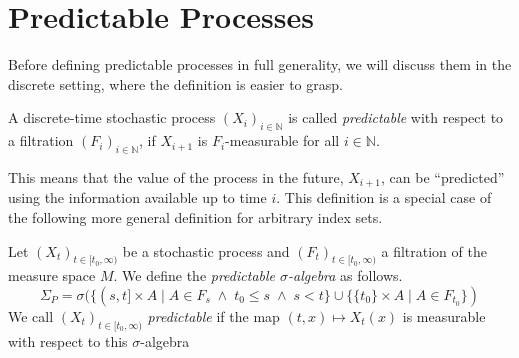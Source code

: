 \section{Predictable Processes}

Before defining predictable processes in full generality, we will discuss them in the discrete setting, where the definition is easier to grasp.

\begin{definition}
	A discrete-time stochastic process $(X_i)_{i\in\mathbb{N}}$ is called \textit{predictable} with respect to a filtration $(F_i)_{i\in\mathbb{N}}$, if $X_{i + 1}$ is $F_i$-measurable for all $i \in \mathbb{N}$.
\end{definition}

This means that the value of the process in the future, $X_{i+1}$, can be ``predicted'' using the information available up to time $i$. This definition is a special case of the following more general definition for arbitrary index sets.

\begin{definition}
	Let $(X_t)_{t\in[t_0, \infty)}$ be a stochastic process and $(F_t)_{t\in[t_0, \infty)}$ a filtration of the measure space $M$. We define the \textit{predictable $\sigma$-algebra} as follows.
	\[
		\Sigma_P = \sigma(\{(s,t] \times A \;\vert\; A \in F_s \;\wedge\; t_0 \le s \;\wedge\; s < t \} \cup \{\{t_0\} \times A \;\vert\; A \in F_{t_0}\})
	\]
	We call $(X_t)_{t\in[t_0, \infty)}$ \textit{predictable} if the map $(t,x) \mapsto X_t(x)$ is measurable with respect to this $\sigma$-algebra
\end{definition}


